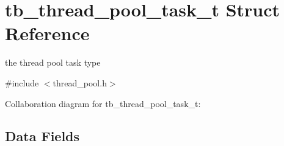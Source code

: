 \hypertarget{structtb__thread__pool__task__t}{\section{tb\-\_\-thread\-\_\-pool\-\_\-task\-\_\-t Struct Reference}
\label{structtb__thread__pool__task__t}
}


the thread pool task type  




{\ttfamily \#include $<$thread\-\_\-pool.\-h$>$}



Collaboration diagram for tb\-\_\-thread\-\_\-pool\-\_\-task\-\_\-t\-:
\subsection*{Data Fields}
